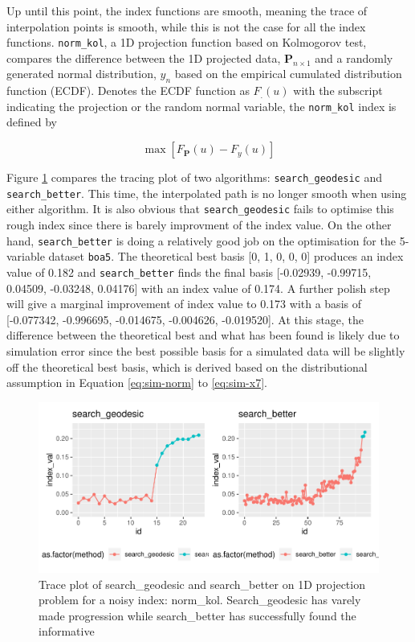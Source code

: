 \documentclass[12pt]{article}
\begin{document}
Up until this point, the index functions are smooth, meaning the trace of interpolation points is smooth, while this is not the case for all the index functions. \texttt{norm\_kol}, a 1D projection function based on Kolmogorov test, compares the difference between the 1D projected data, \(\mathbf{P}_{n \times 1}\) and a randomly generated normal distribution, \(y_n\) based on the empirical cumulated distribution function (ECDF). Denotes the ECDF function as \(F_{.}(u)\) with the subscript indicating the projection or the random normal variable, the \texttt{norm\_kol} index is defined by

\[\max \left[F_{\mathbf{P}}(u) - F_{y}(u)\right]\]

Figure \ref{kol-cdf} compares the tracing plot of two algorithms: \texttt{search\_geodesic} and \texttt{search\_better}. This time, the interpolated path is no longer smooth when using either algorithm. It is also obvious that \texttt{search\_geodesic} fails to optimise this rough index since there is barely improvment of the index value. On the other hand, \texttt{search\_better} is doing a relatively good job on the optimisation for the 5-variable dataset \texttt{boa5}. The theoretical best basis {[}0, 1, 0, 0, 0{]} produces an index value of 0.182 and \texttt{search\_better} finds the final basis {[}-0.02939, -0.99715, 0.04509, -0.03248, 0.04176{]} with an index value of 0.174. A further polish step will give a marginal improvement of index value to 0.173 with a basis of {[}-0.077342, -0.996695, -0.014675, -0.004626, -0.019520{]}. At this stage, the difference between the theoretical best and what has been found is likely due to simulation error since the best possible basis for a simulated data will be slightly off the theoretical best basis, which is derived based on the distributional assumption in Equation \ref{eq:sim-norm} to \ref{eq:sim-x7}.

\begin{figure}
\centering
\includegraphics{paper_files/figure-latex/kol-cdf-1.pdf}
\caption{\label{fig:kol-cdf}\label{kol-cdf}Trace plot of search\_geodesic and search\_better on 1D projection problem for a noisy index: norm\_kol. Search\_geodesic has varely made progression while search\_better has successfully found the informative}
\end{figure}
\end{document}
